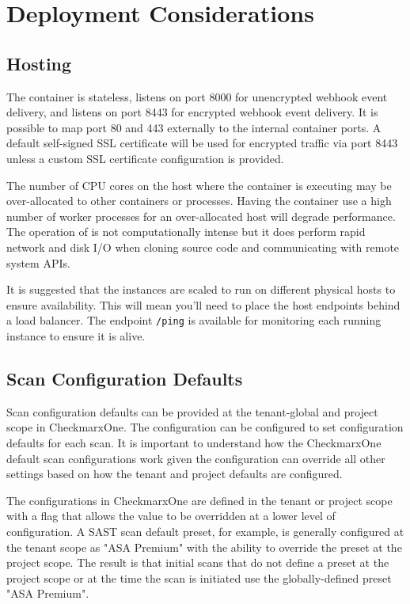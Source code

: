 \section{Deployment Considerations}

\subsection{Hosting}

The \cxoneflow container is stateless, listens on port 8000 for unencrypted webhook event delivery, 
and listens on port 8443 for encrypted webhook event delivery.  It is possible to map port 80 and 443
externally to the internal container ports.  A default self-signed SSL certificate will be used
for encrypted traffic via port 8443 unless a custom SSL certificate configuration is provided.  

The number of CPU cores on the host where the container is executing may be over-allocated to other
containers or processes.  Having the container use a high number of worker processes for an over-allocated
host will degrade performance.  The operation of \cxoneflow is not computationally intense
but it does perform rapid network and disk I/O when cloning source code and communicating with
remote system APIs.

It is suggested that the \cxoneflow instances are scaled to run on different physical hosts to
ensure availability.  This will mean you'll need to place the \cxoneflow host endpoints behind 
a load balancer.  The \cxoneflow endpoint \texttt{/ping} is available for monitoring each
running instance to ensure it is alive.

\subsection{Scan Configuration Defaults}\label{sec:deployment-scan-defaults}

Scan configuration defaults can be provided at the tenant-global and project scope
in CheckmarxOne.  The \cxoneflow configuration can be configured to set configuration
defaults for each scan.  It is important to understand how the CheckmarxOne default
scan configurations work given the \cxoneflow configuration can override all other
settings based on how the tenant and project defaults are configured.

The configurations in CheckmarxOne are defined in the tenant or project scope with a
flag that allows the value to be overridden at a lower level of configuration.  A
SAST scan default preset, for example, is generally configured at the tenant scope
as "ASA Premium" with the ability to override the preset at the project scope.  The
result is that initial scans that do not define a preset at the project scope or
at the time the scan is initiated use the globally-defined preset "ASA Premium".

